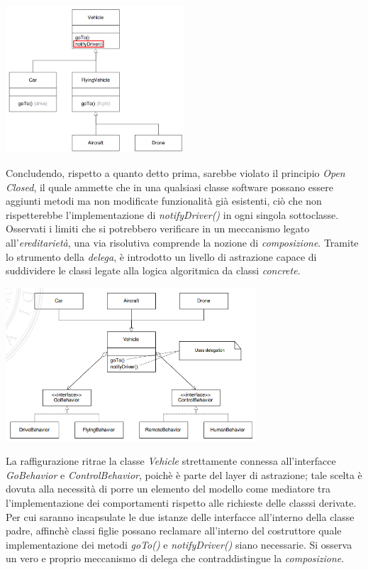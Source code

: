 \documentclass{article}
\begin{document}
\begin{center}
    \includegraphics*[width=0.5\textwidth]{foto 3.png}
\end{center}\vspace*{7pt}
Concludendo, rispetto a quanto detto prima, sarebbe violato il principio \textit{Open Closed}, il quale ammette che in una qualsiasi classe software possano essere aggiunti metodi ma non modificate funzionalità già esistenti, ciò che non rispetterebbe l'implementazione di \textit{notifyDriver()} in ogni singola sottoclasse.\vspace*{14pt}\\
Osservati i limiti che si potrebbero verificare in un meccanismo legato all'\textit{ereditarietà}, una via risolutiva comprende la nozione di \textit{composizione}. Tramite lo strumento della \textit{delega}, è introdotto un livello di astrazione capace di suddividere le classi legate alla logica algoritmica da classi \textit{concrete}.
\begin{center}
    \includegraphics[width=0.7\textwidth]{foto 4.png}
\end{center}\vspace*{7pt}
La raffigurazione ritrae la classe \textit{Vehicle} strettamente connessa all'interfacce \textit{GoBehavior} e \textit{ControlBehavior}, poichè è parte del layer di astrazione; tale scelta è dovuta alla necessità di porre un elemento del modello come mediatore tra l'implementazione dei comportamenti rispetto alle richieste delle classsi derivate. Per cui saranno incapsulate le due istanze delle interfacce all'interno della classe padre, affinchè classi figlie possano reclamare all'interno del costruttore quale implementazione dei metodi \textit{goTo()} e \textit{notifyDriver()} siano necessarie. Si osserva un vero e proprio meccanismo di delega che contraddistingue la \textit{composizione}.\vspace*{14pt}\\
\end{document}
